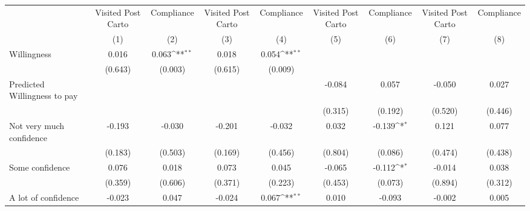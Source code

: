 {
\def\sym#1{\ifmmode^{#1}\else\(^{#1}\)\fi}
\begin{tabular}{l*{8}{c}}
\hline\hline
                &\multicolumn{1}{c}{Visited Post Carto}&\multicolumn{1}{c}{Compliance}&\multicolumn{1}{c}{Visited Post Carto}&\multicolumn{1}{c}{Compliance}&\multicolumn{1}{c}{Visited Post Carto}&\multicolumn{1}{c}{Compliance}&\multicolumn{1}{c}{Visited Post Carto}&\multicolumn{1}{c}{Compliance}\\
                &\multicolumn{1}{c}{(1)}         &\multicolumn{1}{c}{(2)}         &\multicolumn{1}{c}{(3)}         &\multicolumn{1}{c}{(4)}         &\multicolumn{1}{c}{(5)}         &\multicolumn{1}{c}{(6)}         &\multicolumn{1}{c}{(7)}         &\multicolumn{1}{c}{(8)}         \\
\hline
Willingness     &    0.016         &    0.063\sym{**} &    0.018         &    0.054\sym{**} &                  &                  &                  &                  \\
                &  (0.643)         &  (0.003)         &  (0.615)         &  (0.009)         &                  &                  &                  &                  \\
Predicted Willingness to pay&                  &                  &                  &                  &   -0.084         &    0.057         &   -0.050         &    0.027         \\
                &                  &                  &                  &                  &  (0.315)         &  (0.192)         &  (0.520)         &  (0.446)         \\
Not very much confidence&   -0.193         &   -0.030         &   -0.201         &   -0.032         &    0.032         &   -0.139\sym{*}  &    0.121         &    0.077         \\
                &  (0.183)         &  (0.503)         &  (0.169)         &  (0.456)         &  (0.804)         &  (0.086)         &  (0.474)         &  (0.438)         \\
Some confidence &    0.076         &    0.018         &    0.073         &    0.045         &   -0.065         &   -0.112\sym{*}  &   -0.014         &    0.038         \\
                &  (0.359)         &  (0.606)         &  (0.371)         &  (0.223)         &  (0.453)         &  (0.073)         &  (0.894)         &  (0.312)         \\
A lot of confidence&   -0.023         &    0.047         &   -0.024         &    0.067\sym{**} &    0.010         &   -0.093         &   -0.002         &    0.005         \\

\end{tabular}}
